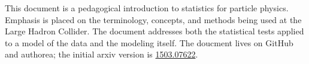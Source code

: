 This document is a pedagogical introduction to statistics for particle physics.  
Emphasis is placed on the terminology, concepts, and methods being used at the Large Hadron Collider.  
The document addresses both the statistical tests applied to a model of the data and the modeling itself.
The doucment lives on GitHub and authorea; the initial arxiv version is \href{http://arxiv.org/abs/1503.07622}{1503.07622}.